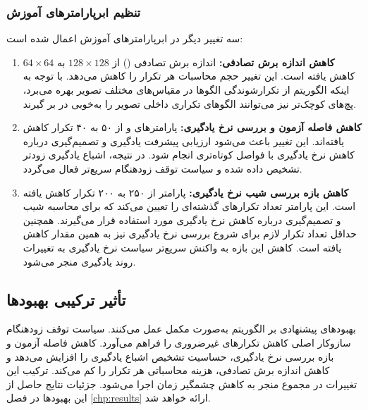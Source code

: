 \subsubsection{تنظیم ابرپارامترهای آموزش}

سه تغییر دیگر در ابرپارامترهای آموزش اعمال شده است:

\begin{enumerate}
\item \textbf{کاهش اندازه برش تصادفی:}
اندازه برش تصادفی () از $128 \times 128$ به $64 \times 64$ کاهش یافته است. این تغییر حجم محاسبات هر تکرار را کاهش می‌دهد. با توجه به اینکه الگوریتم  از تکرارشوندگی الگوها در مقیاس‌های مختلف تصویر بهره می‌برد، پچ‌های کوچک‌تر نیز می‌توانند الگوهای تکراری داخلی تصویر را به‌خوبی در بر گیرند.

\item \textbf{کاهش فاصله آزمون و بررسی نرخ یادگیری:}
پارامترهای  و  از ۵۰ به ۴۰ تکرار کاهش یافته‌اند. این تغییر باعث می‌شود ارزیابی پیشرفت یادگیری و تصمیم‌گیری درباره کاهش نرخ یادگیری با فواصل کوتاه‌تری انجام شود. در نتیجه، اشباع یادگیری زودتر تشخیص داده شده و سیاست توقف زودهنگام سریع‌تر فعال می‌گردد.

\item \textbf{کاهش بازه بررسی شیب نرخ یادگیری:}
پارامتر  از ۲۵۰ به ۲۰۰ تکرار کاهش یافته است. این پارامتر تعداد تکرارهای گذشته‌ای را تعیین می‌کند که برای محاسبه شیب  و تصمیم‌گیری درباره کاهش نرخ یادگیری مورد استفاده قرار می‌گیرند. همچنین حداقل تعداد تکرار لازم برای شروع بررسی نرخ یادگیری نیز به همین مقدار کاهش یافته است. کاهش این بازه به واکنش سریع‌تر سیاست نرخ یادگیری به تغییرات روند یادگیری منجر می‌شود.
\end{enumerate}

\subsection{تأثیر ترکیبی بهبودها}

بهبودهای پیشنهادی بر الگوریتم  به‌صورت مکمل عمل می‌کنند. سیاست توقف زودهنگام سازوکار اصلی کاهش تکرارهای غیرضروری را فراهم می‌آورد. کاهش فاصله آزمون و بازه بررسی نرخ یادگیری، حساسیت تشخیص اشباع یادگیری را افزایش می‌دهد و کاهش اندازه برش تصادفی، هزینه محاسباتی هر تکرار را کم می‌کند. ترکیب این تغییرات در مجموع منجر به کاهش چشمگیر زمان اجرا می‌شود. جزئیات نتایج حاصل از این بهبودها در فصل \ref{chp:results} ارائه خواهد شد.
